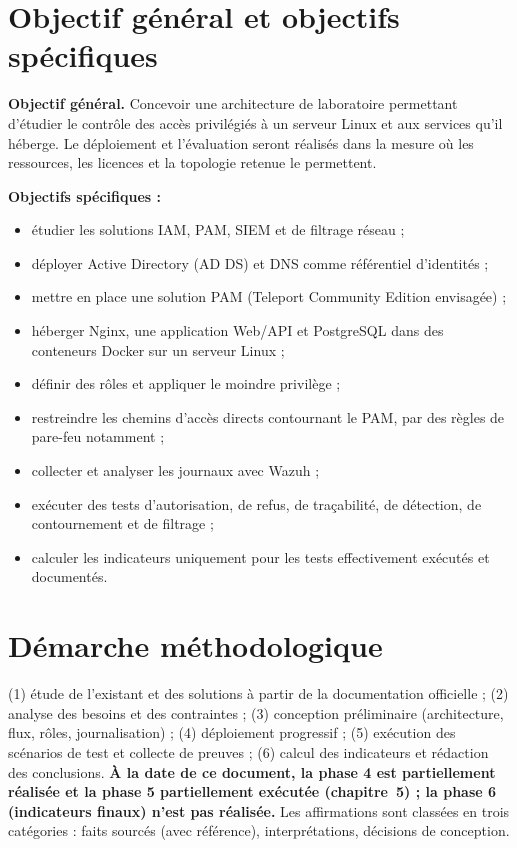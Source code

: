 \documentclass[11pt,a4paper]{report}
\begin{document}
\section{Objectif général et objectifs spécifiques}
\textbf{Objectif général.} Concevoir une architecture de laboratoire permettant d'étudier le contrôle des accès privilégiés à un serveur Linux et aux services qu'il héberge. Le déploiement et l'évaluation seront réalisés dans la mesure où les ressources, les licences et la topologie retenue le permettent.

\textbf{Objectifs spécifiques :}
\begin{itemize}
\item étudier les solutions IAM, PAM, SIEM et de filtrage réseau ;
\item déployer Active Directory (AD DS) et DNS comme référentiel d'identités ;
\item mettre en place une solution PAM (Teleport Community Edition envisagée) ;
\item héberger Nginx, une application Web/API et PostgreSQL dans des conteneurs Docker sur un serveur Linux ;
\item définir des rôles et appliquer le moindre privilège ;
\item restreindre les chemins d'accès directs contournant le PAM, par des règles de pare-feu notamment ;
\item collecter et analyser les journaux avec Wazuh ;
\item exécuter des tests d'autorisation, de refus, de traçabilité, de détection, de contournement et de filtrage ;
\item calculer les indicateurs uniquement pour les tests effectivement exécutés et documentés.
\end{itemize}

\section{Démarche méthodologique}
(1) étude de l'existant et des solutions à partir de la documentation officielle ; (2) analyse des besoins et des contraintes ; (3) conception préliminaire (architecture, flux, rôles, journalisation) ; (4) déploiement progressif ; (5) exécution des scénarios de test et collecte de preuves ; (6) calcul des indicateurs et rédaction des conclusions. \textbf{À la date de ce document, la phase 4 est partiellement réalisée et la phase 5 partiellement exécutée (chapitre~5) ; la phase 6 (indicateurs finaux) n'est pas réalisée.} Les affirmations sont classées en trois catégories : faits sourcés (avec référence), interprétations, décisions de conception.
\end{document}

